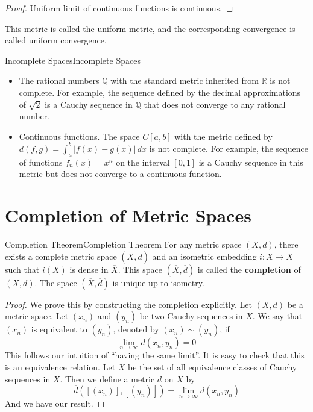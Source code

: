 \documentclass[../main.tex]{subfiles}
\begin{document}
\begin{proof}
Uniform limit of continuous functions is continuous.
\end{proof}
\begin{remark}
	This metric is called the uniform metric, and the corresponding convergence is called uniform convergence.
\end{remark}

\begin{example}{Incomplete Spaces}{Incomplete Spaces}
	\begin{itemize}
		\item The rational numbers $\mathbb{Q}$ with the standard metric inherited from $\mathbb{R}$ is not complete. For example, the sequence defined by the decimal approximations of $\sqrt{2}$ is a Cauchy sequence in $\mathbb{Q}$ that does not converge to any rational number.
		\item Continuous functions. The space $C[a,b]$ with the metric defined by $\displaystyle d(f, g) = \int_a^b |f(x) - g(x)| \, dx$ is not complete. For example, the sequence of functions $f_n(x) = x^n$ on the interval $[0, 1]$ is a Cauchy sequence in this metric but does not converge to a continuous function.
	\end{itemize}
\end{example}

\section{Completion of Metric Spaces}

\begin{theorem}{Completion Theorem}{Completion Theorem}
	For any metric space $(X, d)$, there exists a complete metric space $(\overline{X}, \overline{d})$ and an isometric embedding $i: X \to \overline{X}$ such that $i(X)$ is dense in $\overline{X}$. This space $(\overline{X}, \overline{d})$ is called the \textbf{completion} of $(X, d)$. The space $(\overline{X}, \overline{d})$ is unique up to isometry.
\end{theorem}

\begin{proof}
	We prove this by constructing the completion explicitly. Let $(X, d)$ be a metric space. Let $(x_n)$ and $(y_n)$ be two Cauchy sequences in $X$. We say that $(x_n)$ is equivalent to $(y_n)$, denoted by $(x_n) \sim (y_n)$, if
	\begin{equation*}
		\lim_{n \to \infty} d(x_n, y_n) = 0
	\end{equation*}
	This follows our intuition of ``having the same limit''. It is easy to check that this is an equivalence relation. Let $\overline{X}$ be the set of all equivalence classes of Cauchy sequences in $X$. Then we define a metric $\overline{d}$ on $\overline{X}$ by
	\begin{equation*}
		\overline{d}([(x_n)], [(y_n)]) = \lim_{n \to \infty} d(x_n, y_n)
	\end{equation*}
	And we have our result.
\end{proof}
\end{document}
